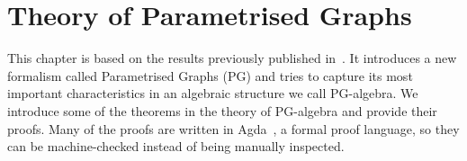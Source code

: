

\usepackage{amstext}
\usepackage{amssymb}
\usepackage{stmaryrd}


\newcommand{\redFG}[1]{\textcolor[rgb]{0.6,0,0}{#1}}
\newcommand{\greenFG}[1]{\textcolor[rgb]{0,0.4,0}{#1}}
\newcommand{\blueFG}[1]{\textcolor[rgb]{0,0,0.8}{#1}}
\newcommand{\orangeFG}[1]{\textcolor[rgb]{0.8,0.4,0}{#1}}
\newcommand{\purpleFG}[1]{\textcolor[rgb]{0.4,0,0.4}{#1}}
\newcommand{\yellowFG}[1]{\textcolor{yellow}{#1}}
\newcommand{\brownFG}[1]{\textcolor[rgb]{0.5,0.2,0.2}{#1}}
\newcommand{\blackFG}[1]{\textcolor[rgb]{0,0,0}{#1}}
\newcommand{\whiteFG}[1]{\textcolor[rgb]{1,1,1}{#1}}
\newcommand{\yellowBG}[1]{\colorbox[rgb]{1,1,0.2}{#1}}
\newcommand{\brownBG}[1]{\colorbox[rgb]{1.0,0.7,0.4}{#1}}

\newcommand{\ColourStuff}{
  \newcommand{\red}{\redFG}
  \newcommand{\green}{\greenFG}
  \newcommand{\blue}{\blueFG}
  \newcommand{\orange}{\orangeFG}
  \newcommand{\purple}{\purpleFG}
  \newcommand{\yellow}{\yellowFG}
  \newcommand{\brown}{\brownFG}
  \newcommand{\black}{\blackFG}
  \newcommand{\white}{\whiteFG}
}

\newcommand{\MonochromeStuff}{
  \newcommand{\red}{\blackFG}
  \newcommand{\green}{\blackFG}
  \newcommand{\blue}{\blackFG}
  \newcommand{\orange}{\blackFG}
  \newcommand{\purple}{\blackFG}
  \newcommand{\yellow}{\blackFG}
  \newcommand{\brown}{\blackFG}
  \newcommand{\black}{\blackFG}
  \newcommand{\white}{\blackFG}
}

\MonochromeStuff

\newcommand{\K}[1]{\yellow{\mathsf{#1}}}
\newcommand{\Q}[1]{\green{\mathsf{#1}}}
\newcommand{\D}[1]{\blue{\mathsf{#1}}}
\newcommand{\C}[1]{\red{\mathsf{#1}}}
\newcommand{\F}[1]{\green{\mathsf{#1}}}
\newcommand{\V}[1]{\purple{\mathit{#1}}}

\newcommand{\dfeq}{\overset{\mathrm{df}}{=}}


\chapter{Theory of Parametrised Graphs \label{chap:PGAlgebra}}

This chapter is based on the results previously published in~\cite{pg_algebra}. 
It introduces a new formalism called Parametrised Graphs (PG) and tries to capture its 
most important characteristics in an algebraic structure we call PG-algebra.
We introduce some of the theorems in the theory of PG-algebra and provide their proofs.
Many of the proofs are written in Agda~\cite{norell:thesis}, a formal proof language,
so they can be machine-checked instead of being manually inspected.


